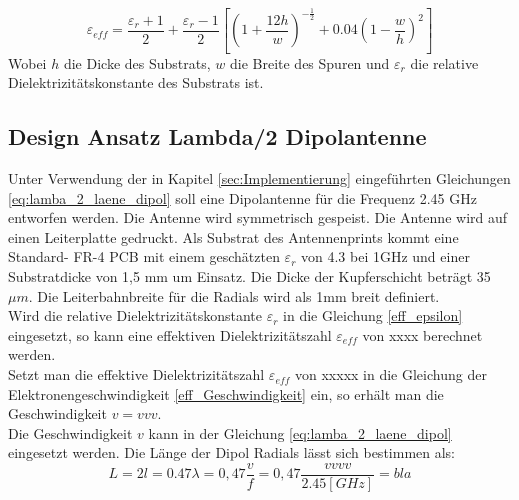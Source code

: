 \begin{equation}\label{eff_epsilon}
\varepsilon_{eff}=\dfrac{\varepsilon_r+1}{2}+\dfrac{\varepsilon_r-1}{2}\left[\left(1+\dfrac{12h}{w}\right)^{-\frac{1}{2}}+0.04\left(1-\dfrac{w}{h}\right)^{2}\right]
\end{equation}
Wobei $h$ die Dicke des Substrats, $w$ die Breite des Spuren und  $\varepsilon_{r}$ die relative Dielektrizitätskonstante des Substrats ist. 

\subsection{Design Ansatz Lambda/2 Dipolantenne}  
Unter Verwendung der in Kapitel \ref{sec:Implementierung} eingeführten Gleichungen \ref{eq:lamba_2_laene_dipol} soll eine Dipolantenne für die Frequenz 2.45 GHz entworfen werden. Die Antenne wird symmetrisch gespeist. Die Antenne wird auf einen Leiterplatte gedruckt. Als Substrat des Antennenprints kommt eine Standard- FR-4 PCB mit einem geschätzten  $\varepsilon_r $ von 4.3 bei 1GHz und einer Substratdicke von 1,5 mm  um Einsatz. Die Dicke der Kupferschicht beträgt 35 $\mu m$. Die Leiterbahnbreite für die Radials wird als 1mm breit definiert.\\

Wird die relative Dielektrizitätskonstante $\varepsilon_{r}$ in die Gleichung \ref{eff_epsilon} eingesetzt, so kann eine effektiven Dielektrizitätszahl $\varepsilon_{eff}$  von xxxx berechnet werden.\\

Setzt man die effektive Dielektrizitätszahl $\varepsilon_{eff}$ von xxxxx  in die Gleichung der Elektronengeschwindigkeit \ref{eff_Geschwindigkeit} ein, so erhält man die Geschwindigkeit $v=vvv$. \\
Die Geschwindigkeit $v$  kann in der  Gleichung \ref{eq:lamba_2_laene_dipol} eingesetzt werden. Die Länge der Dipol Radials lässt sich bestimmen als:
\begin{equation}\label{eq:lamba_2_laene_dipol}
L=2l = 0.47 \lambda= 0,47 \dfrac{v}{f}=0,47 \dfrac{vvvv}{2.45[GHz]}=bla
\end{equation} 





